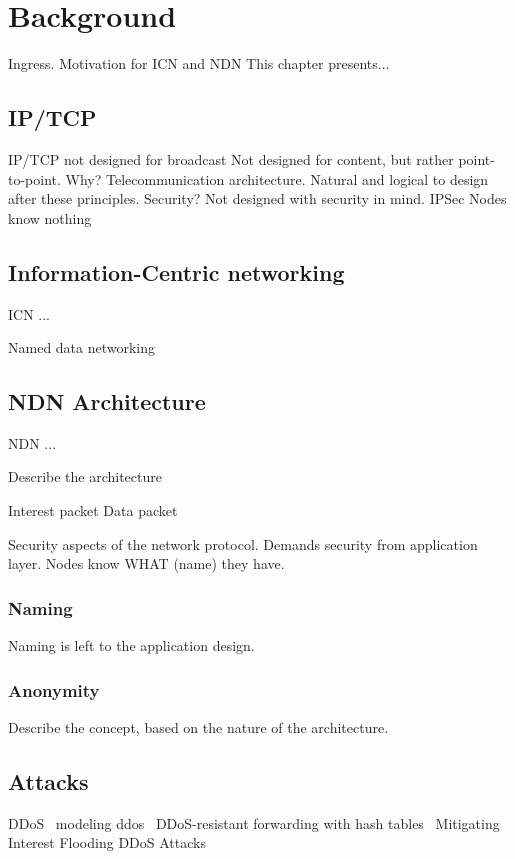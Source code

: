 \chapter{Background}\label{chp:background} 
Ingress. 
Motivation for ICN and NDN
This chapter presents...

\section{IP/TCP}
IP/TCP not designed for broadcast
Not designed for content, but rather point-to-point. 
Why? Telecommunication architecture. 
Natural and logical to design after these principles.
Security? Not designed with security in mind. IPSec
Nodes know nothing

\section{Information-Centric networking}\label{chp2:sec:icn}
\gls{ICN} ...


Named data networking~\cite{DBLP:journals/ccr/0001ABJcCPWZ14}

\section{NDN Architecture}\label{chp2:sec:ndn_architecture}
\gls{NDN} ...

Describe the architecture ~\cite{NDN-0021}

Interest packet
Data packet

Security aspects of the network protocol. 
Demands security from application layer.
Nodes know WHAT (name) they have. 

\subsection{Naming}
Naming is left to the application design.

\subsection{Anonymity}
Describe the concept, based on the nature of the architecture.

\section{Attacks}
DDoS~\cite{DBLP:conf/icccn/GastiTU013}
modeling ddos~\cite{DBLP:journals/ijcomsys/WangCZQZ14}
DDoS-resistant forwarding with hash tables~\cite{DBLP:conf/ancs/SoNO13}
Mitigating Interest Flooding DDoS Attacks~\cite{DBLP:journals/corr/abs-1303-4823}

